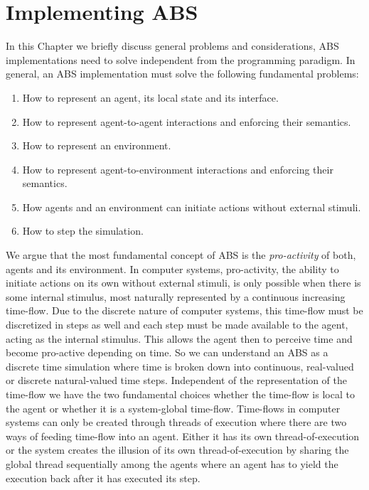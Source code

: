 \chapter{Implementing ABS}
\label{ch:impl_abs}
In this Chapter we briefly discuss general problems and considerations, ABS implementations need to solve independent from the programming paradigm. In general, an ABS implementation must solve the following fundamental problems:

\begin{enumerate}
	\item How to represent an agent, its local state and its interface.
	\item How to represent agent-to-agent interactions and enforcing their semantics.
	\item How to represent an environment.
	\item How to represent agent-to-environment interactions and enforcing their semantics.
	\item How agents and an environment can initiate actions without external stimuli.
	\item How to step the simulation.
\end{enumerate}

We argue that the most fundamental concept of ABS is the \textit{pro-activity} of both, agents and its environment. In computer systems, pro-activity, the ability to initiate actions on its own without external stimuli, is only possible when there is some internal stimulus, most naturally represented by a continuous increasing time-flow. Due to the discrete nature of computer systems, this time-flow must be discretized in steps as well and each step must be made available to the agent, acting as the internal stimulus. This allows the agent then to perceive time and become pro-active depending on time. So we can understand an ABS as a discrete time simulation where time is broken down into continuous, real-valued or discrete natural-valued time steps. Independent of the representation of the time-flow we have the two fundamental choices whether the time-flow is local to the agent or whether it is a system-global time-flow. Time-flows in computer systems can only be created through threads of execution where there are two ways of feeding time-flow into an agent. Either it has its own thread-of-execution or the system creates the illusion of its own thread-of-execution by sharing the global thread sequentially among the agents where an agent has to yield the execution back after it has executed its step. %

